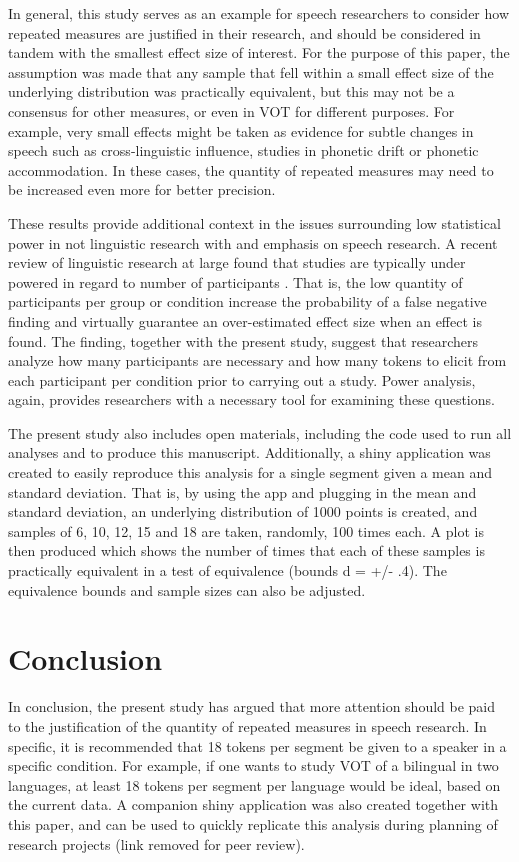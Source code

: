 \documentclass[
  a4paper,
  11pt,
  twocolumn]{article}
\begin{document}
In general, this study serves as an example for speech researchers to
consider how repeated measures are justified in their research, and
should be considered in tandem with the smallest effect size of
interest. For the purpose of this paper, the assumption was made that
any sample that fell within a small effect size of the underlying
distribution was practically equivalent, but this may not be a consensus
for other measures, or even in VOT for different purposes. For example,
very small effects might be taken as evidence for subtle changes in
speech such as cross-linguistic influence, studies in phonetic drift or
phonetic accommodation. In these cases, the quantity of repeated
measures may need to be increased even more for better precision.

These results provide additional context in the issues surrounding low
statistical power in not linguistic research with and emphasis on speech
research. A recent review of linguistic research at large found that
studies are typically under powered in regard to number of participants
\cite{brysbaert2021power}. That is, the low quantity of participants per
group or condition increase the probability of a false negative finding
and virtually guarantee an over-estimated effect size when an effect is
found. The finding, together with the present study, suggest that
researchers analyze how many participants are necessary and how many
tokens to elicit from each participant per condition prior to carrying
out a study. Power analysis, again, provides researchers with a
necessary tool for examining these questions.

The present study also includes open materials, including the code used
to run all analyses and to produce this manuscript. Additionally, a
shiny application was created to easily reproduce this analysis for a
single segment given a mean and standard deviation. That is, by using
the app and plugging in the mean and standard deviation, an underlying
distribution of 1000 points is created, and samples of 6, 10, 12, 15 and
18 are taken, randomly, 100 times each. A plot is then produced which
shows the number of times that each of these samples is practically
equivalent in a test of equivalence (bounds d = +/- .4). The equivalence
bounds and sample sizes can also be adjusted.

\section{Conclusion}

In conclusion, the present study has argued that more attention should
be paid to the justification of the quantity of repeated measures in
speech research. In specific, it is recommended that 18 tokens per
segment be given to a speaker in a specific condition. For example, if
one wants to study VOT of a bilingual in two languages, at least 18
tokens per segment per language would be ideal, based on the current
data. A companion shiny application was also created together with this
paper, and can be used to quickly replicate this analysis during
planning of research projects (link removed for peer review).




\theendnotes
\end{document}
